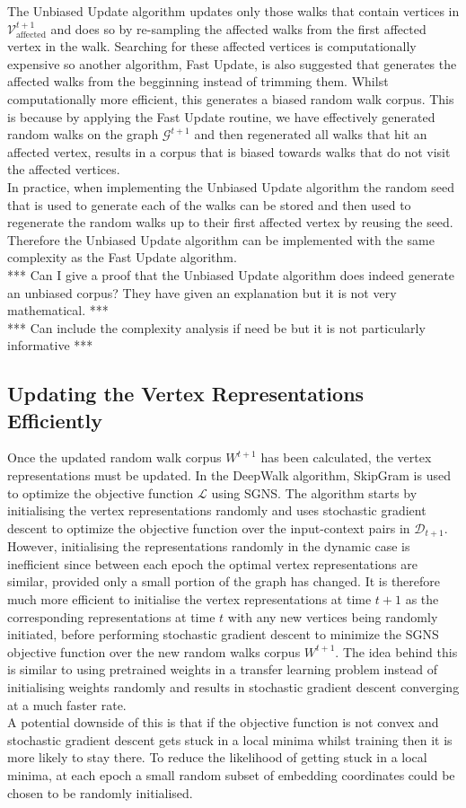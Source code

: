 \documentclass[a4paper]{article}
\newcommand{\D}{\mathcal D}
\renewcommand{\G}{\mathcal G}
\renewcommand{\V}{\mathcal V}
\begin{document}
The Unbiased Update algorithm updates only those walks that contain vertices in
$\V^{t+1}_{\text{affected}}$ and does so by re-sampling the affected walks from
the first affected vertex in the walk. Searching for these affected vertices is computationally expensive so another algorithm,
Fast Update, is also suggested that generates the affected walks from the
begginning instead of trimming them. Whilst computationally more efficient, this
generates a biased random walk corpus. This is because by applying the Fast Update routine, we have
effectively generated random walks on the graph $\G^{t+1}$ and then regenerated
all walks that hit an affected vertex, results in a corpus that is biased towards walks
that do not visit the affected vertices.\\
In practice, when implementing the Unbiased Update algorithm the random seed
that is used to generate each of the walks can be stored and then used to
regenerate the random walks up to their first affected vertex by reusing the
seed. Therefore the Unbiased Update algorithm can be implemented with the same
complexity as the Fast Update algorithm.\\
*** Can I give a proof that the Unbiased Update algorithm does indeed generate
an unbiased corpus? They have given an explanation but it is not very
mathematical. ***\\
*** Can include the complexity analysis if need be but it is not particularly
informative ***

\subsection{Updating the Vertex Representations Efficiently}
Once the updated random walk corpus $W^{t+1}$ has been calculated, the vertex
representations must be updated. In the DeepWalk algorithm, SkipGram is used to
optimize the objective function $\mathcal{L}$ using SGNS.
The algorithm starts by initialising the vertex representations randomly and
uses stochastic gradient descent to optimize the objective function over the
input-context pairs in $\D_{t+1}$.\\
However, initialising the representations randomly in the dynamic case is
inefficient since between each epoch the optimal vertex representations are
similar, provided only a small portion of the graph has changed. It is therefore much more efficient to initialise the vertex
representations at time $t+1$ as the corresponding representations at time $t$
with any new vertices being randomly initiated, before performing stochastic gradient
descent to minimize the SGNS objective function over the new random walks corpus
$W^{t+1}$. The idea behind this is similar to using pretrained weights in a transfer
learning problem instead of initialising weights randomly and results in
stochastic gradient descent converging at a much faster rate.\\
A potential downside of this is that if the objective function is not convex and
stochastic gradient descent gets stuck in a local minima whilst training then it
is more likely to stay there. To reduce the likelihood of getting stuck in a local
minima, at each epoch a small random subset of embedding coordinates could be chosen to be randomly initialised.
\end{document}
